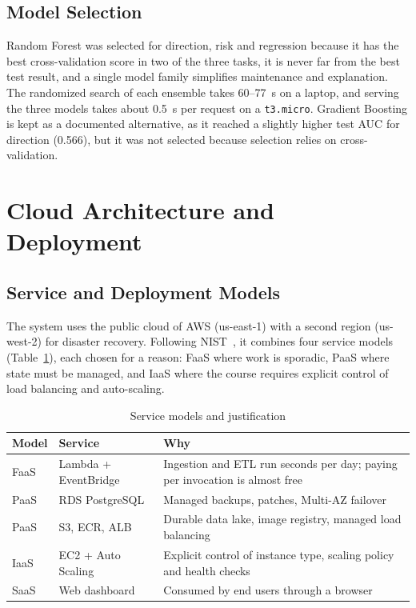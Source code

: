 \documentclass[conference]{IEEEtran}
\begin{document}
\subsection{Model Selection}
Random Forest was selected for direction, risk and regression because it has the best cross-validation score in two of the three tasks, it is never far from the best test result, and a single model family simplifies maintenance and explanation. The randomized search of each ensemble takes 60--77~s on a laptop, and serving the three models takes about 0.5~s per request on a \texttt{t3.micro}. Gradient Boosting is kept as a documented alternative, as it reached a slightly higher test AUC for direction (0.566), but it was not selected because selection relies on cross-validation.

\section{Cloud Architecture and Deployment}
\subsection{Service and Deployment Models}
The system uses the public cloud of AWS (us-east-1) with a second region (us-west-2) for disaster recovery. Following NIST~\cite{nist800145}, it combines four service models (Table~\ref{tab:services}), each chosen for a reason: FaaS where work is sporadic, PaaS where state must be managed, and IaaS where the course requires explicit control of load balancing and auto-scaling.

\begin{table}[t]
\caption{Service models and justification}
\label{tab:services}
\centering
\footnotesize
\begin{tabular}{@{}p{1.0cm}p{2.3cm}p{4.1cm}@{}}
\toprule
Model & Service & Why \\
\midrule
FaaS & Lambda + EventBridge & Ingestion and ETL run seconds per day; paying per invocation is almost free \\
PaaS & RDS PostgreSQL & Managed backups, patches, Multi-AZ failover \\
PaaS & S3, ECR, ALB & Durable data lake, image registry, managed load balancing \\
IaaS & EC2 + Auto Scaling & Explicit control of instance type, scaling policy and health checks \\
SaaS & Web dashboard & Consumed by end users through a browser \\
\bottomrule
\end{tabular}
\end{table}
\end{document}

